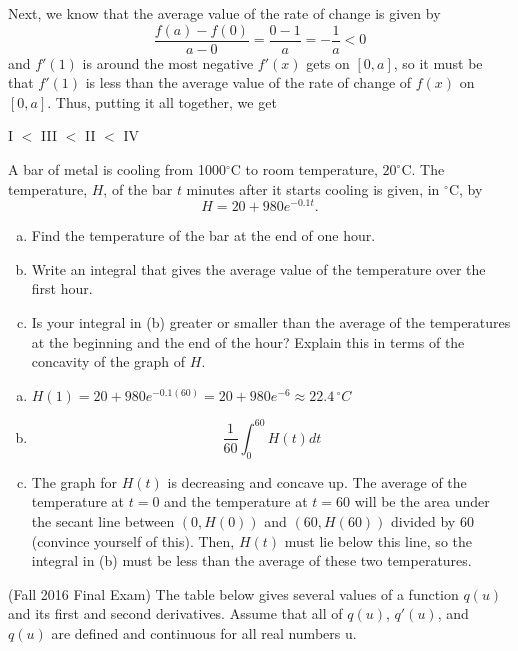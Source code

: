 \documentclass[11pt]{exam}
\begin{document}
\begin{questions}
\begin{solution}
      Next, we know that the average value of the rate of change is
      given by \[
        \frac{f(a)-f(0)}{a-0} = \frac{0-1}{a} = -\frac{1}{a} < 0
      \]
      and \(f'(1)\) is around the most negative \(f'(x)\) gets on
      \([0,a]\), so it must be that \(f'(1)\) is less than the average
      value of the rate of change of \(f(x)\) on \([0,a]\). Thus,
      putting it all together, we get
      \begin{center}
        I \(<\) III \(<\) II \(<\) IV
      \end{center}
    \end{solution}
  \question A bar of metal is cooling from 1000$^\circ$C to room temperature, $20^\circ$C.  The temperature, $H$, of the bar $t$ minutes after it starts cooling is given, in $^\circ$C, by $$H=20+980e^{-0.1t}.$$
\begin{enumerate}[(a)]
	\item Find the temperature of the bar at the end of one hour.
	\item Write an integral that gives the average value of the temperature over the first hour.
	\item Is your integral in (b) greater or smaller than the average of the temperatures at the beginning and the end of the hour?  Explain this in terms of the concavity of the graph of $H$.
\end{enumerate}
\begin{solution}
  \begin{enumerate}[(a)]
  \item \(H(1) = 20+980 e^{-0.1 (60)} = 20+980 e^{-6} \approx 22.4
    \, {}^\circ C\) 
  \item \[
      \frac{1}{60} \int_0^{60} H(t) dt
    \]
  \item The graph for \(H(t)\) is decreasing and concave up. The average of the
    temperature at \(t=0\) and the temperature at \(t=60\) will be
    the area under the secant line between \((0,H(0))\) and
    \((60,H(60))\) divided by \(60\) (convince yourself of
    this). Then, \(H(t)\) must lie below this line, so the integral in
    (b) must be less than the average of these two temperatures.
  \end{enumerate}
\end{solution}
\question (Fall 2016 Final Exam) %
The table below gives several values of a function $q(u)$ and its first and second derivatives. Assume that all of $q(u)$, $q'(u)$, and $q(u)$ are defined and continuous for all real numbers u.	
\begin{center}

\end{center}
\end{questions}
\end{document}
